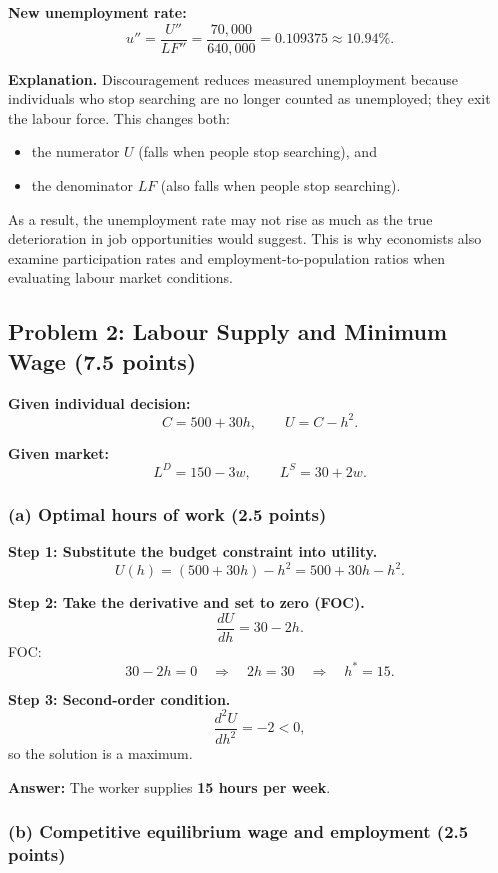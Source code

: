\documentclass[11pt]{article}
\begin{document}
\textbf{New unemployment rate:}
\[
u'' = \frac{U''}{LF''}
= \frac{70{,}000}{640{,}000}
= 0.109375 \approx 10.94\%.
\]

\textbf{Explanation.}
Discouragement reduces measured unemployment because individuals who stop searching are no longer counted as unemployed; they exit the labour force.
This changes both:
\begin{itemize}
\item the numerator $U$ (falls when people stop searching), and
\item the denominator $LF$ (also falls when people stop searching).
\end{itemize}
As a result, the unemployment rate may not rise as much as the true deterioration in job opportunities would suggest. This is why economists also examine participation rates and employment-to-population ratios when evaluating labour market conditions.

\subsection*{Problem 2: Labour Supply and Minimum Wage (7.5 points)}

\textbf{Given individual decision:}
\[
C = 500 + 30h,
\qquad
U = C - h^2.
\]

\textbf{Given market:}
\[
L^D = 150 - 3w,
\qquad
L^S = 30 + 2w.
\]

\subsubsection*{(a) Optimal hours of work (2.5 points)}

\textbf{Step 1: Substitute the budget constraint into utility.}
\[
U(h) = (500 + 30h) - h^2
= 500 + 30h - h^2.
\]

\textbf{Step 2: Take the derivative and set to zero (FOC).}
\[
\frac{dU}{dh} = 30 - 2h.
\]
FOC:
\[
30 - 2h = 0
\quad \Rightarrow \quad
2h = 30
\quad \Rightarrow \quad
h^* = 15.
\]

\textbf{Step 3: Second-order condition.}
\[
\frac{d^2U}{dh^2} = -2 < 0,
\]
so the solution is a maximum.

\textbf{Answer:} The worker supplies \textbf{15 hours per week}.

\subsubsection*{(b) Competitive equilibrium wage and employment (2.5 points)}
\end{document}
